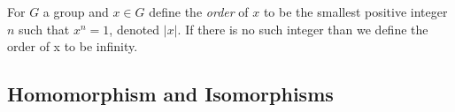\documentclass[../main]{subfiles}
\begin{document}
 \begin{dfn}
  For $G$ a group and $x\in G$ define the \textit{order} of $x$ to be the smallest positive integer $n$ such that $x^n = 1$, denoted $|x|$. If there is no such integer than we define the order of x to be infinity. 
 \end{dfn}
 
 
 \subsection{Homomorphism and Isomorphisms}
 
 \begin{dfn}
  
 \end{dfn}

 
 
 
\end{document}
